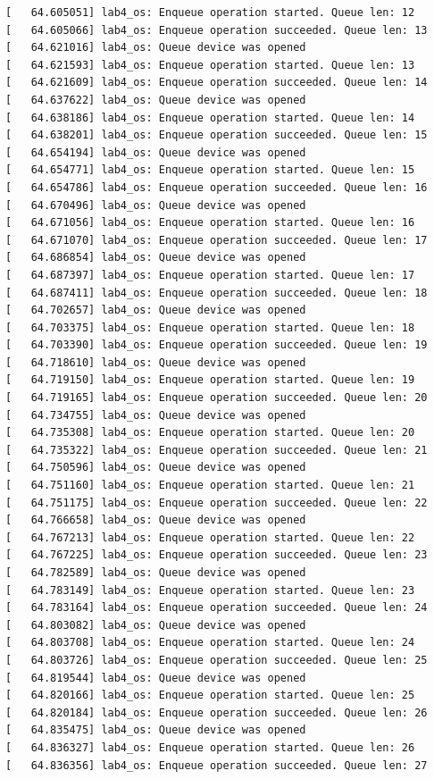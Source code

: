\documentclass[a4paper,14pt]{extarticle}
\begin{document}
\begin{verbatim}
[   64.605051] lab4_os: Enqueue operation started. Queue len: 12
[   64.605066] lab4_os: Enqueue operation succeeded. Queue len: 13
[   64.621016] lab4_os: Queue device was opened
[   64.621593] lab4_os: Enqueue operation started. Queue len: 13
[   64.621609] lab4_os: Enqueue operation succeeded. Queue len: 14
[   64.637622] lab4_os: Queue device was opened
[   64.638186] lab4_os: Enqueue operation started. Queue len: 14
[   64.638201] lab4_os: Enqueue operation succeeded. Queue len: 15
[   64.654194] lab4_os: Queue device was opened
[   64.654771] lab4_os: Enqueue operation started. Queue len: 15
[   64.654786] lab4_os: Enqueue operation succeeded. Queue len: 16
[   64.670496] lab4_os: Queue device was opened
[   64.671056] lab4_os: Enqueue operation started. Queue len: 16
[   64.671070] lab4_os: Enqueue operation succeeded. Queue len: 17
[   64.686854] lab4_os: Queue device was opened
[   64.687397] lab4_os: Enqueue operation started. Queue len: 17
[   64.687411] lab4_os: Enqueue operation succeeded. Queue len: 18
[   64.702657] lab4_os: Queue device was opened
[   64.703375] lab4_os: Enqueue operation started. Queue len: 18
[   64.703390] lab4_os: Enqueue operation succeeded. Queue len: 19
[   64.718610] lab4_os: Queue device was opened
[   64.719150] lab4_os: Enqueue operation started. Queue len: 19
[   64.719165] lab4_os: Enqueue operation succeeded. Queue len: 20
[   64.734755] lab4_os: Queue device was opened
[   64.735308] lab4_os: Enqueue operation started. Queue len: 20
[   64.735322] lab4_os: Enqueue operation succeeded. Queue len: 21
[   64.750596] lab4_os: Queue device was opened
[   64.751160] lab4_os: Enqueue operation started. Queue len: 21
[   64.751175] lab4_os: Enqueue operation succeeded. Queue len: 22
[   64.766658] lab4_os: Queue device was opened
[   64.767213] lab4_os: Enqueue operation started. Queue len: 22
[   64.767225] lab4_os: Enqueue operation succeeded. Queue len: 23
[   64.782589] lab4_os: Queue device was opened
[   64.783149] lab4_os: Enqueue operation started. Queue len: 23
[   64.783164] lab4_os: Enqueue operation succeeded. Queue len: 24
[   64.803082] lab4_os: Queue device was opened
[   64.803708] lab4_os: Enqueue operation started. Queue len: 24
[   64.803726] lab4_os: Enqueue operation succeeded. Queue len: 25
[   64.819544] lab4_os: Queue device was opened
[   64.820166] lab4_os: Enqueue operation started. Queue len: 25
[   64.820184] lab4_os: Enqueue operation succeeded. Queue len: 26
[   64.835475] lab4_os: Queue device was opened
[   64.836327] lab4_os: Enqueue operation started. Queue len: 26
[   64.836356] lab4_os: Enqueue operation succeeded. Queue len: 27

\end{verbatim}
\end{document}
